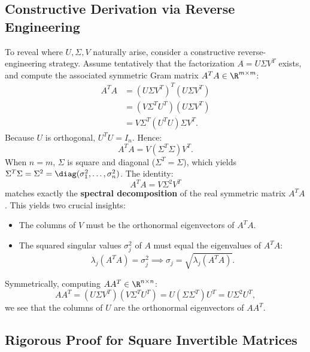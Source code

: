 \subsection{Constructive Derivation via Reverse Engineering}

To reveal where $U, \Sigma, V$ naturally arise, consider a constructive reverse-engineering strategy. Assume tentatively that the factorization $A = U \Sigma V^T$ exists, and compute the associated symmetric Gram matrix $A^T A \in \R^{m \times m}$:
\begin{align}
    A^T A &= (U \Sigma V^T)^T (U \Sigma V^T) \nonumber \\
          &= (V \Sigma^T U^T)(U \Sigma V^T) \nonumber \\
          &= V \Sigma^T (U^T U) \Sigma V^T.
\end{align}
Because $U$ is orthogonal, $U^T U = I_n$. Hence:
\begin{equation}
    A^T A = V (\Sigma^T \Sigma) V^T.
\end{equation}
When $n = m$, $\Sigma$ is square and diagonal ($\Sigma^T = \Sigma$), which yields $\Sigma^T \Sigma = \Sigma^2 = \diag(\sigma_1^2, \dots, \sigma_n^2)$. 
The identity:
\begin{equation}
    A^T A = V \Sigma^2 V^T
\end{equation}
matches exactly the \textbf{spectral decomposition} of the real symmetric matrix $A^T A$. This yields two crucial insights:
\begin{itemize}
    \item The columns of $V$ must be the orthonormal eigenvectors of $A^T A$.
    \item The squared singular values $\sigma_j^2$ of $A$ must equal the eigenvalues of $A^T A$:
    \begin{equation}
        \lambda_j(A^T A) = \sigma_j^2 \implies \sigma_j = \sqrt{\lambda_j(A^T A)}.
    \end{equation}
\end{itemize}

Symmetrically, computing $A A^T \in \R^{n \times n}$:
\begin{equation}
    A A^T = (U \Sigma V^T)(V \Sigma^T U^T) = U (\Sigma \Sigma^T) U^T = U \Sigma^2 U^T,
\end{equation}
we see that the columns of $U$ are the orthonormal eigenvectors of $A A^T$.

\subsection{Rigorous Proof for Square Invertible Matrices}

